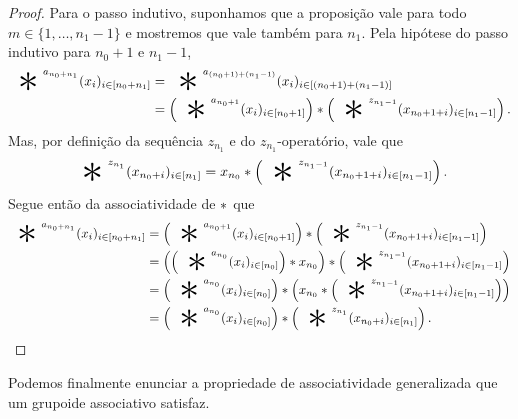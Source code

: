 \begin{proof}
Para o passo indutivo, suponhamos que a proposição vale para todo $m \in \{1,\ldots, n_1-1\}$ e mostremos que vale também para $n_1$. Pela hipótese do passo indutivo para $n_0+1$ e $n_1-1$,
	\begin{align*}
	\bigopb\nolimits^{a_{n_0+n_1}} (x_i)_{i \in [n_0+n_1]} &= \bigopb\nolimits^{a_{(n_0+1)+(n_1-1)}} (x_i)_{i \in [(n_0+1)+(n_1-1)]} \\
		&= \left( \bigopb\nolimits^{a_{n_0+1}} (x_i)_{i \in [n_0+1]} \right) \opb \left( \bigopb\nolimits^{z_{n_1-1}} (x_{n_0+1+i})_{i \in [n_1-1]} \right).
	\end{align*}
Mas, por definição da sequência $z_{n_1}$ e do $z_{n_1}$-operatório, vale que
	\begin{equation*}
	\bigopb\nolimits^{z_{n_1}} (x_{n_0+i})_{i \in [n_1]} = x_{n_0} \opb \left( \bigopb\nolimits^{z_{n_1-1}} (x_{n_0+1+i})_{i \in [n_1-1]} \right).
	\end{equation*}
Segue então da associatividade de $\ast$ que
	\begin{align*}
	\bigopb\nolimits^{a_{n_0+n_1}} (x_i)_{i \in [n_0+n_1]} &= \left( \bigopb\nolimits^{a_{n_0+1}} (x_i)_{i \in [n_0+1]} \right) \opb \left( \bigopb\nolimits^{z_{n_1-1}} (x_{n_0+1+i})_{i \in [n_1-1]} \right) \\
		&= \left( \left( \bigopb\nolimits^{a_{n_0}} (x_i)_{i \in [n_0]} \right) \opb x_{n_0} \right) \opb \left( \bigopb\nolimits^{z_{n_1-1}} (x_{n_0+1+i})_{i \in [n_1-1]} \right) \\
		&= \left( \bigopb\nolimits^{a_{n_0}} (x_i)_{i \in [n_0]} \right) \opb \left( x_{n_0} \opb \left( \bigopb\nolimits^{z_{n_1-1}} (x_{n_0+1+i})_{i \in [n_1-1]} \right) \right) \\
		&= \left( \bigopb\nolimits^{a_{n_0}} (x_i)_{i \in [n_0]} \right) \opb \left( \bigopb\nolimits^{z_{n_1}} (x_{n_0+i})_{i \in [n_1]} \right).
		\qedhere
	\end{align*}
\end{proof}

Podemos finalmente enunciar a propriedade de associatividade generalizada que um grupoide associativo satisfaz.

